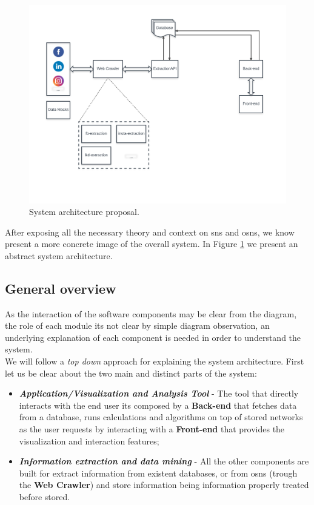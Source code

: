 \begin{figure}[h!]
\begin{center}
  \hspace*{-0.3in}
  \includegraphics[width=1.1\textwidth]{img/architecture.png}
\end{center}
\caption{\label{img:architectureprop} System architecture proposal.}
\end{figure}

After exposing all the necessary theory and context on \glspl{sn} and \glspl{osn}, we know present a more concrete
image of the overall system. In Figure \ref{img:architectureprop} we present an abstract system architecture.

\subsection{General overview}
As the interaction of the software components may be clear from the diagram, the role of each module its not clear by simple
diagram observation, an underlying explanation of each component is needed in order to understand the system.\\
\indent We will follow a \textit{top down} approach for explaining the system architecture. First let us be clear about the two
main and distinct parts of the system:
\begin{itemize}
    \item \textbf{\textit{Application/Visualization and Analysis Tool}} - The tool that directly interacts with the end user
    its composed by a \textbf{Back-end} that fetches data from a database, runs calculations and algorithms on top of stored networks
    as the user requests by interacting with a \textbf{Front-end} that provides the visualization and interaction features;
    \item \textbf{\textit{Information extraction and data mining}} - All the other components are built for extract information
    from existent databases, or from \glspl{osn} (trough the \textbf{Web Crawler}) and store information being information properly treated before stored.
\end{itemize}


